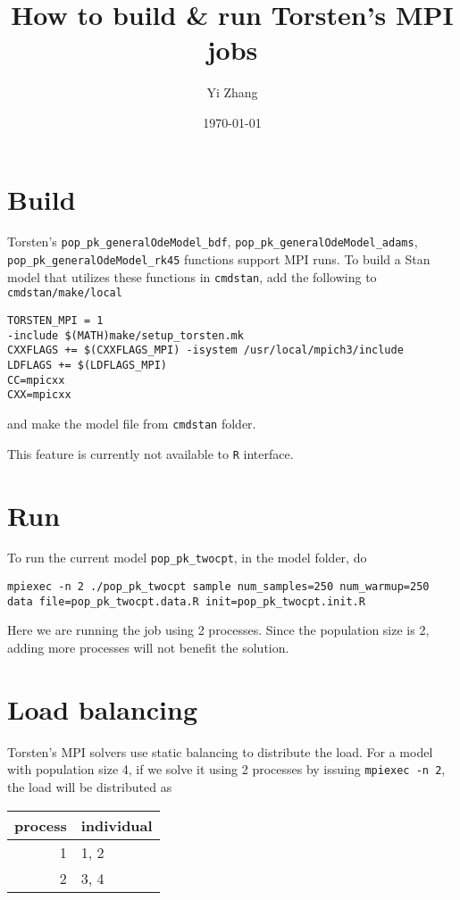 \documentclass[11pt]{article}
\author{Yi Zhang}
\date{\today}
\title{How to build \& run Torsten's MPI jobs}
\begin{document}
\maketitle

\section{Build}
\label{sec:org137a4f4}
Torsten's \texttt{pop\_pk\_generalOdeModel\_bdf}, \texttt{pop\_pk\_generalOdeModel\_adams},
\texttt{pop\_pk\_generalOdeModel\_rk45} functions support MPI
runs. To build a Stan model that utilizes these functions in \texttt{cmdstan},
add the following to \texttt{cmdstan/make/local}
\begin{verbatim}
TORSTEN_MPI = 1
-include $(MATH)make/setup_torsten.mk
CXXFLAGS += $(CXXFLAGS_MPI) -isystem /usr/local/mpich3/include
LDFLAGS += $(LDFLAGS_MPI)
CC=mpicxx
CXX=mpicxx
\end{verbatim}

and make the model file from \texttt{cmdstan} folder.

This feature is currently not available to \texttt{R} interface.

\section{Run}
\label{sec:org5cd88d7}
To run the current model \texttt{pop\_pk\_twocpt}, in the model
folder, do
\begin{verbatim}
mpiexec -n 2 ./pop_pk_twocpt sample num_samples=250 num_warmup=250 data file=pop_pk_twocpt.data.R init=pop_pk_twocpt.init.R
\end{verbatim}

Here we are running the job using 2 processes. Since the
population size is 2, adding more processes will not benefit
the solution.

\section{Load balancing}
\label{sec:org37ef1b5}
Torsten's MPI solvers use static balancing to
distribute the load. For a model with population size 4, 
if we solve it using
2 processes by issuing \texttt{mpiexec -n 2},
the load will be
distributed as
\begin{center}
\begin{tabular}{rl}
process & individual\\
\hline
1 & 1, 2\\
2 & 3, 4\\
\end{tabular}
\end{center}
\end{document}
